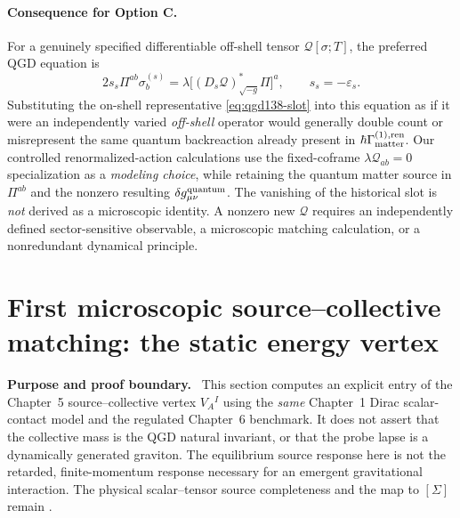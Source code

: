 \documentclass[11pt,a4paper]{article}
\theoremstyle{remark}\newtheorem{remark}[theorem]{Remark}
\begin{document}
\paragraph{Consequence for Option C.}
For a genuinely specified differentiable off-shell tensor
$\mathcal Q[\sigma;T]$, the preferred QGD equation is
\begin{equation}\label{eq:qgd138-optionC}
 \boxed{2s_s\Pi^{ab}\sigma_b^{(s)}=
 \lambda\bigl[(D_s\mathcal Q)^*_{\sqrt{-g}}\Pi\bigr]^a,\qquad
 s_s=-\varepsilon_s.}
\end{equation}
Substituting the on-shell representative
\eqref{eq:qgd138-slot} into this equation as if it were an
independently varied \emph{off-shell} operator would generally
double count or misrepresent the
same quantum backreaction already present in
$\hbar\Gamma_{\rm matter}^{(1),\rm ren}$.
Our controlled renormalized-action calculations use the
fixed-coframe $\lambda\mathcal Q_{ab}=0$ specialization as a
\emph{modeling choice}, while retaining the quantum matter source
in $\Pi^{ab}$ and the nonzero resulting
$\delta g_{\mu\nu}^{\rm quantum}$. The vanishing of the historical
slot is \emph{not} derived as a microscopic identity.
A nonzero new $\mathcal Q$ requires an independently defined
sector-sensitive observable, a microscopic matching calculation, or a
nonredundant dynamical principle.


\begingroup\small\setlength{\parskip}{3pt}
\section{First microscopic source--collective matching: the static energy vertex}
\label{sec:v34-energyvertex}
\textbf{Purpose and proof boundary.} \D\ This section computes an explicit entry of the
Chapter~5 source--collective vertex $V_A{}^I$ using the \emph{same}
Chapter~1 Dirac scalar-contact model and the regulated Chapter~6 benchmark.
It does not assert that the collective mass is the QGD natural invariant, or
that the probe lapse is a dynamically generated graviton. The equilibrium
source response here is not the retarded, finite-momentum response necessary
for an emergent gravitational interaction. The physical scalar--tensor
source completeness and the map to $[\Sigma]$ remain \OPEN.
\end{document}
